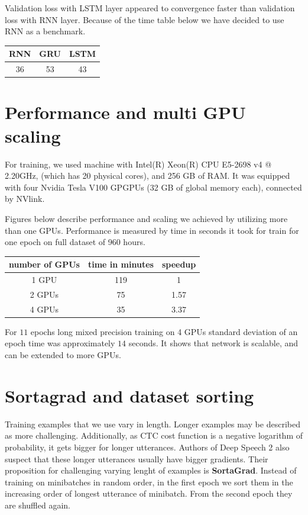 \documentclass[licencjacka,en]{pracamgr}
\begin{document}
Validation loss with LSTM layer appeared to convergence faster than validation loss with RNN layer. Because of the time table below we have decided to use RNN as a benchmark.

{
\centering
\begin{tabular}{|c|c|c|}
        \hline
        RNN & GRU & LSTM \\
        \hline
        \hline
        36 & 53 & 43 \\
        \hline
    \end{tabular}
}


\section{Performance and multi GPU scaling}
For training, we used machine with Intel(R) Xeon(R) CPU E5-2698 v4 @ 2.20GHz, (which has 20 physical cores), and 256 GB of RAM. It was equipped with four Nvidia Tesla V100 GPGPUs (32 GB of global memory each), connected by NVlink.

Figures below describe performance and scaling we achieved by utilizing more than one GPUs. Performance is measured by time in seconds it took for train for one epoch on full dataset of 960 hours.

{
\centering
\begin{tabular}{|c|c|c|}
        \hline
        number of GPUs & time in minutes & speedup \\
        \hline
        1 GPU & 119 & 1 \\
        \hline
        2 GPUs & 75 & 1.57 \\
        \hline
        4 GPUs & 35 & 3.37 \\
        \hline
    \end{tabular}
}

For $11$ epochs long mixed precision training on 4 GPUs standard deviation of an epoch time was approximately $14$ seconds. It shows that network is scalable, and can be extended to more GPUs.


\section{Sortagrad and dataset sorting}
Training examples that we use vary in length. Longer examples may be described as more challenging. Additionally, as CTC cost function is a negative logarithm of probability, it gets bigger for longer utterances. Authors of Deep Speech 2 also suspect that these longer utterances usually have bigger gradients. Their proposition for challenging varying lenght of examples is \textbf{SortaGrad}. Instead of training on minibatches in random order, in the first epoch we sort them in the increasing order of longest utterance of minibatch. From the second epoch they are shuffled again.
\end{document}

